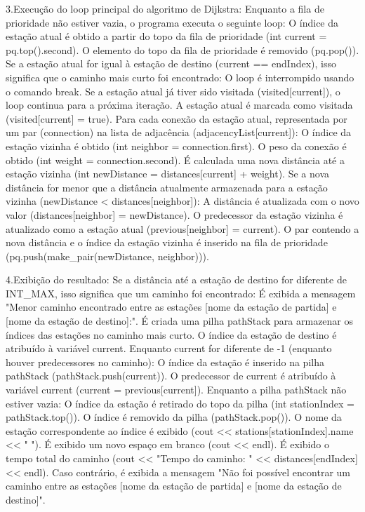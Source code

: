 3.Execução do loop principal do algoritmo de Dijkstra:
Enquanto a fila de prioridade não estiver vazia, o programa executa o seguinte loop:
O índice da estação atual é obtido a partir do topo da fila de prioridade (int current = pq.top().second).
O elemento do topo da fila de prioridade é removido (pq.pop()).
Se a estação atual for igual à estação de destino (current == endIndex), isso significa que o caminho mais curto foi encontrado:
O loop é interrompido usando o comando break.
Se a estação atual já tiver sido visitada (visited[current]), o loop continua para a próxima iteração.
A estação atual é marcada como visitada (visited[current] = true).
Para cada conexão da estação atual, representada por um par (connection) na lista de adjacência (adjacencyList[current]):
O índice da estação vizinha é obtido (int neighbor = connection.first).
O peso da conexão é obtido (int weight = connection.second).
É calculada uma nova distância até a estação vizinha (int newDistance = distances[current] + weight).
Se a nova distância for menor que a distância atualmente armazenada para a estação vizinha (newDistance < distances[neighbor]):
A distância é atualizada com o novo valor (distances[neighbor] = newDistance).
O predecessor da estação vizinha é atualizado como a estação atual (previous[neighbor] = current).
O par contendo a nova distância e o índice da estação vizinha é inserido na fila de prioridade (pq.push(make_pair(newDistance, neighbor))).

4.Exibição do resultado:
Se a distância até a estação de destino for diferente de INT_MAX, isso significa que um caminho foi encontrado:
É exibida a mensagem "Menor caminho encontrado entre as estações [nome da estação de partida] e [nome da estação de destino]:".
É criada uma pilha pathStack para armazenar os índices das estações no caminho mais curto.
O índice da estação de destino é atribuído à variável current.
Enquanto current for diferente de -1 (enquanto houver predecessores no caminho):
O índice da estação é inserido na pilha pathStack (pathStack.push(current)).
O predecessor de current é atribuído à variável current (current = previous[current]).
Enquanto a pilha pathStack não estiver vazia:
O índice da estação é retirado do topo da pilha (int stationIndex = pathStack.top()).
O índice é removido da pilha (pathStack.pop()).
O nome da estação correspondente ao índice é exibido (cout << stations[stationIndex].name << " ").
É exibido um novo espaço em branco (cout << endl).
É exibido o tempo total do caminho (cout << "Tempo do caminho: " << distances[endIndex] << endl).
Caso contrário, é exibida a mensagem "Não foi possível encontrar um caminho entre as estações [nome da estação de partida] e [nome da estação de destino]".

